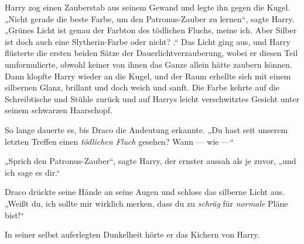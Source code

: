 Harry zog einen Zauberstab aus seinem Gewand und legte ihn gegen die Kugel.
„Nicht gerade die beste Farbe, um den Patronus-Zauber zu lernen“, sagte Harry.
„Grünes Licht ist genau der Farbton des tödlichen Fluchs, meine ich. Aber Silber ist doch auch eine Slytherin-Farbe oder nicht? .“ Das Licht ging aus, und Harry flüsterte die ersten beiden Sätze der Dauerlichtverzauberung, wobei er diesen Teil umformulierte, obwohl keiner von ihnen das Ganze allein hätte zaubern können. Dann klopfte Harry wieder an die Kugel, und der Raum erhellte sich mit einem silbernen Glanz, brillant und doch weich und sanft. Die Farbe kehrte auf die Schreibtische und Stühle zurück und auf Harrys leicht verschwitztes Gesicht unter seinem schwarzen Haarschopf.

So lange dauerte es, bis Draco die Andeutung erkannte.
„Du hast seit unserem letzten Treffen einen \emph{tödlichen Fluch} gesehen? Wann — wie —“

„Sprich den Patronus-Zauber“, sagte Harry, der ernster aussah als je zuvor, „und ich sage es dir.“

Draco drückte seine Hände an seine Augen und schloss das silberne Licht aus.
„Weißt du, ich sollte mir wirklich merken, dass du zu \emph{schräg} für \emph{normale} Pläne bist!“

In seiner selbst auferlegten Dunkelheit hörte er das Kichern von Harry.

